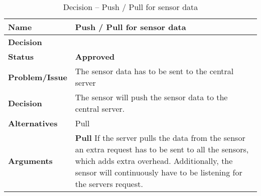 \begin{table}[H]
	\begin{tabular}{L{0.2\textwidth} L{0.6\textwidth}}
		\textbf{Name}          & \textbf{Push / Pull for sensor data}                        \\ \toprule
		\textbf{Decision}      &                                                    \\ \midrule \midrule
		\textbf{Status}        & \textbf{Approved}                                           \\ \midrule
		\textbf{Problem/Issue} & The sensor data has to be sent to the central server        \\ \midrule
		\textbf{Decision}      & The sensor will push the sensor data to the central server. \\ \midrule
		\textbf{Alternatives}  & Pull \\ \midrule %
		\textbf{Arguments}     &                                               
		\textbf{Pull} If the server pulls the data from the sensor an extra request has to be sent to all the sensors, which adds extra overhead.
		Additionally, the sensor will continuously have to be listening for the servers request.
		\\ \bottomrule
	\end{tabular}
	\caption{Decision -- Push / Pull for sensor data}
	\label{table:pushpull}
\end{table}

